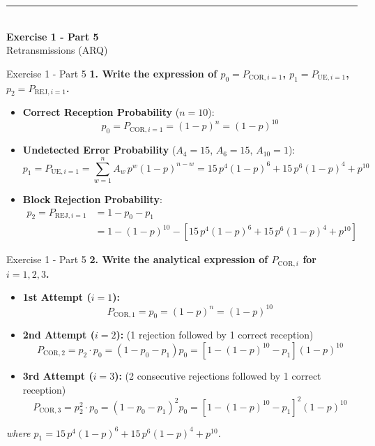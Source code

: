 \documentclass[10pt, aspectratio=169]{beamer}
\newcommand{\question}[1]{{\color{QuestionRed}\textbf{#1}}}
\begin{document}
\begin{frame}[plain]
  \vfill
  \centering
  {\color{TealAccent}\rule{2cm}{2pt}}\\[0.4cm]
  {\LARGE\bfseries\color{NavyPrimary} Exercise 1 - Part 5}\\[0.2cm]
  {\large\color{SlateNeutral} Retransmissions (ARQ)}
  \vfill
\end{frame}

\begin{frame}{Exercise 1 - Part 5}
	\question{1. Write the expression of $p_0 = P_{\text{COR}, i=1}$, $p_1 = P_{\text{UE}, i=1}$, $p_2 = P_{\text{REJ}, i=1}$.}
	
	\vspace{0.15cm}
	\small
	\begin{itemize}
		\item \textbf{Correct Reception Probability} ($n = 10$):
		\[
		p_0 = P_{\text{COR}, i=1} = (1 - p)^n = (1 - p)^{10}
		\]
		\item \textbf{Undetected Error Probability} ($A_4 = 15$, $A_6 = 15$, $A_{10} = 1$):
		\[
		p_1 = P_{\text{UE}, i=1} = \sum_{w=1}^{n} A_w \, p^w (1 - p)^{n - w} = 15\,p^4(1-p)^6 + 15\,p^6(1-p)^4 + p^{10}
		\]
		\item \textbf{Block Rejection Probability}:
		\[
		\begin{aligned}
			p_2 = P_{\text{REJ}, i=1} &= 1 - p_0 - p_1 \\
			&= 1 - (1 - p)^{10} - \left[15\,p^4(1-p)^6 + 15\,p^6(1-p)^4 + p^{10}\right]
		\end{aligned}
		\]
	\end{itemize}
\end{frame}

\begin{frame}{Exercise 1 - Part 5}
	\question{2. Write the analytical expression of $P_{\text{COR}, i}$ for $i = 1, 2, 3$.}
	
	\vspace{0.15cm}
	\small
	\begin{itemize}
		\item \textbf{1st Attempt ($i = 1$):}
		\[
		P_{\text{COR}, 1} = p_0 = (1 - p)^n = (1 - p)^{10}
		\]
		\item \textbf{2nd Attempt ($i = 2$):} (1 rejection followed by 1 correct reception)
		\[
		P_{\text{COR}, 2} = p_2 \cdot p_0 = (1 - p_0 - p_1) p_0 = \left[1 - (1-p)^{10} - p_1\right](1 - p)^{10}
		\]
		\item \textbf{3rd Attempt ($i = 3$):} (2 consecutive rejections followed by 1 correct reception)
		\[
		P_{\text{COR}, 3} = p_2^2 \cdot p_0 = (1 - p_0 - p_1)^2 p_0 = \left[1 - (1-p)^{10} - p_1\right]^2(1 - p)^{10}
		\]
	\end{itemize}
	{\footnotesize \textit{where $p_1 = 15\,p^4(1-p)^6 + 15\,p^6(1-p)^4 + p^{10}$.}}
\end{frame}
\end{document}
